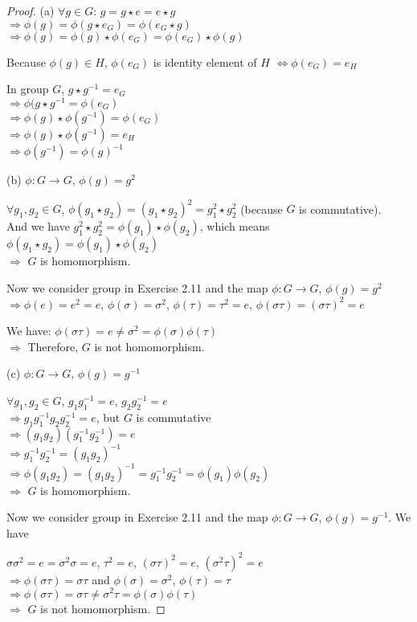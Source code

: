 \begin{proof}
(a) $\forall g \in G$: $g = g \star e = e \star g$ \\ $\Rightarrow \phi(g) = \phi(g \star e_G) = \phi(e_G \star g)$ \\ $\Rightarrow \phi(g) = \phi(g) \star \phi(e_G) = \phi(e_G) \star \phi(g)$

Because $\phi(g) \in H$, $\phi(e_G)$ is identity element of $H$ $\Leftrightarrow \phi(e_G) = e_H$

In group $G$, $g \star g^{-1} = e_G$ \\ $\Rightarrow \phi(g \star g^{-1} = \phi(e_G)$ \\ $\Rightarrow \phi(g) \star \phi(g^{-1}) = \phi(e_G)$ \\ $\Rightarrow \phi(g) \star \phi(g^{-1}) = e_H$ \\ $\Rightarrow \phi(g^{-1}) = \phi(g)^{-1}$

(b) $\phi: G \rightarrow G$, $\phi(g) = g^2$

$\forall g_1, g_2 \in G$, $\phi(g_1 \star g_2) = (g_1 \star g_2)^2 = g_1^2 \star g_2^2$ (because $G$ is commutative). \\ And we have $g_1^2 \star g_2^2 = \phi(g_1) \star \phi(g_2)$, which means $\phi(g_1 \star g_2) = \phi(g_1) \star \phi(g_2)$ \\ $\Rightarrow$ $G$ is homomorphism.

Now we consider group in Exercise 2.11 and the map $\phi: G \rightarrow G$, $\phi(g)=g^2$ \\ $\Rightarrow \phi(e) = e^2 = e$, $\phi(\sigma) = \sigma^2$, $\phi(\tau) = \tau^2 = e$, $\phi(\sigma\tau) = (\sigma\tau)^2 = e$

We have: $\phi(\sigma\tau) = e \neq \sigma^2 = \phi(\sigma)\phi(\tau)$ \\ $\Rightarrow$ Therefore, $G$ is not homomorphism.

(c) $\phi: G \rightarrow G$, $\phi(g) = g^{-1}$

$\forall g_1, g_2 \in G$, $g_1 g_1^{-1} = e$, $g_2 g_2^{-1} = e$ \\ $\Rightarrow g_1 g_1^{-1} g_2 g_2^{-1} = e$, but $G$ is commutative \\ $\Rightarrow (g_1 g_2)(g_1^{-1} g_2^{-1}) = e$ \\ $\Rightarrow g_1^{-1} g_2^{-1} = (g_1 g_2)^{-1}$ \\ $\Rightarrow \phi(g_1 g_2) = (g_1 g_2)^{-1} = g_1^{-1} g_2^{-1} = \phi(g_1) \phi(g_2)$ \\ $\Rightarrow$ $G$ is homomorphism.

Now we consider group in Exercise 2.11 and the map $\phi: G \rightarrow G$, $\phi(g) = g^{-1}$. We have

$\sigma\sigma^2 = e = \sigma^2\sigma = e$, \quad $\tau^2 = e$, \quad $(\sigma\tau)^2 = e$, \quad $(\sigma^2\tau)^2 = e$ \\ $\Rightarrow \phi(\sigma\tau) = \sigma\tau$ \quad and \quad $\phi(\sigma) = \sigma^2$, $\phi(\tau) = \tau$ \\ $\Rightarrow \phi(\sigma\tau) = \sigma\tau \neq \sigma^2\tau = \phi(\sigma)\phi(\tau)$ \\ $\Rightarrow$ $G$ is not homomorphism.
\end{proof}

